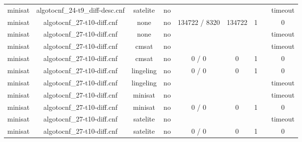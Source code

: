 \begin{appendices}
\begin{table}[p]
\begin{center}
\begin{tabular}{l|cccccccc}
  minisat                        & algotocnf\_24-t9\_diff-desc.cnf & satelite   & no    &            &           &           &            & timeout \\ %
  minisat                        & algotocnf\_27-t10-diff.cnf     & none       & no    & 134722 / 8320 & 134722    & 1         &            & 0 \\ %
  minisat                        & algotocnf\_27-t10-diff.cnf     & none       & no    &            &           &           &            & timeout \\ %
  minisat                        & algotocnf\_27-t10-diff.cnf     & cmsat      & no    &            &           &           &            & timeout \\ %
  minisat                        & algotocnf\_27-t10-diff.cnf     & cmsat      & no    & 0 / 0      & 0         & 1         &            & 0 \\ %
  minisat                        & algotocnf\_27-t10-diff.cnf     & lingeling  & no    & 0 / 0      & 0         & 1         &            & 0 \\ %
  minisat                        & algotocnf\_27-t10-diff.cnf     & lingeling  & no    &            &           &           &            & timeout \\ %
  minisat                        & algotocnf\_27-t10-diff.cnf     & minisat    & no    &            &           &           &            & timeout \\ %
  minisat                        & algotocnf\_27-t10-diff.cnf     & minisat    & no    & 0 / 0      & 0         & 1         &            & 0 \\ %
  minisat                        & algotocnf\_27-t10-diff.cnf     & satelite   & no    &            &           &           &            & timeout \\ %
  minisat                        & algotocnf\_27-t10-diff.cnf     & satelite   & no    & 0 / 0      & 0         & 1         &            & 0 \\ %

\end{tabular}
\end{center}
\end{table}
\end{appendices}
